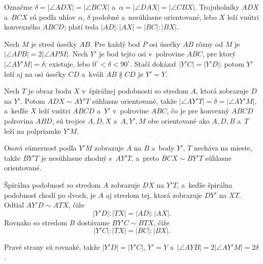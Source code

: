%
{
    Označme $\delta = |\angle ADX| = |\angle BCX|$ a~$\alpha = |\angle DAX| = |\angle CBX|$. Trojuholníky $ADX$ a~$BCX$ sú podľa uhlov $\alpha$, $\delta$ podobné a~nesúhlasne orientované, lebo $X$ leží vnútri konvexného $ABCD$; platí teda $|AD| : |AX| = |BC| : |BX|$.

    Nech $M$ je stred úsečky $AB$. Pre každý bod $P$ osi úsečky $AB$ rôzny od $M$ je $|\angle APB| = 2|\angle APM|$. Nech $Y'$ je bod tejto osi v~polrovine $ABC$, pre ktorý $|\angle AY'M| = \delta$; existuje, lebo $0^\circ < \delta < 90^\circ$. Stačí dokázať $|Y'C| = |Y'D|$: potom $Y'$ leží aj na osi úsečky $CD$ a~kvôli $AB \nparallel CD$ je $Y' = Y$.

    Nech $T$ je obraz bodu $X$ v~špirálnej podobnosti so stredom $A$, ktorá zobrazuje $D$ na $Y'$. Potom $ADX \sim AY'T$ súhlasne orientované, takže $|\angle AY'T| = \delta = |\angle AY'M|$, a~keďže $X$ leží vnútri $ABCD$ a~$Y'$ v~polrovine $ABC$, čo je pre konvexný $ABCD$ polrovina $ABD$, sú trojice $A, D, X$ a~$A, Y', M$ obe orientované ako $A, D, B$ a~$T$ leží na polpriamke $Y'M$.


    Osová súmernosť podľa $Y'M$ zobrazuje $A$ na $B$ a~body $Y'$, $T$ necháva na mieste, takže $BY'T$ je nesúhlasne zhodný s~$AY'T$, a~preto $BCX \sim BY'T$ súhlasne orientované.

    Špirálna podobnosť so stredom $A$ zobrazuje $DX$ na $Y'T$, a~keďže špirálna podobnosť chodí po dvoch, je $A$ aj stredom tej, ktorá zobrazuje $DY'$ na $XT$. Odtiaľ $AY'D \sim ATX$, čiže
    $$
    |Y'D| : |TX| = |AD| : |AX|.
    $$
    Rovnako so stredom $B$ dostávame $BY'C \sim BTX$, čiže
    $$
    |Y'C| : |TX| = |BC| : |BX|.
    $$

    Pravé strany sú rovnaké, takže $|Y'D| = |Y'C|$, $Y' = Y$ a~$|\angle AYB| = 2|\angle AY'M| = 2\delta$.
}

\DisplayHints

\DisplayProblemSolutions

\bye
